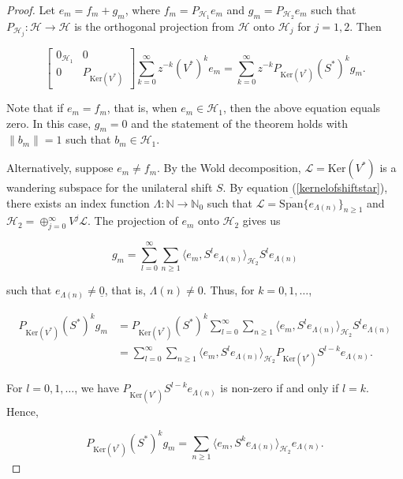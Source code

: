 \documentclass[10pt, reqno]{amsart}
\theoremstyle{definition}
\numberwithin{equation}{section}
\begin{document}
\begin{proof}
Let $e_{m}=f_{m}+g_{m}$, where $f_{m}=P_{\mathcal{H}_{1}}e_{m}$ and $g_{m}=P_{\mathcal{H}_{2}}e_{m}$ such that $P_{\mathcal{H}_{j}}:\mathcal{H}\rightarrow \mathcal{H}$ is the orthogonal projection from $\mathcal{H}$ onto $\mathcal{H}_{j}$ for $j=1,2$. Then

$$\begin{bmatrix}
0_{\mathcal{H}_{1}} & 0\\
0& P_{\mathrm{Ker}(V^{*})}
\end{bmatrix}\sum_{k=0}^{\infty}z^{-k}(V^{*})^{k}e_{m} = \sum_{k=0}^{\infty}z^{-k}
 P_{\mathrm{Ker}(V^{*})}(S^{*})^{k}g_{m}.$$

\noindent Note that if $e_{m}=f_{m}$, that is, when $e_{m}\in\mathcal{H}_{1}$, then the above equation equals zero. In this case, $g_{m}=0$ and the statement of the theorem holds with $\|b_{m}\|=1$ such that $b_{m}\in\mathcal{H}_{1}$. 

Alternatively, suppose $e_{m}\neq f_{m}$. By the Wold decomposition, $\mathcal{L}=\mathrm{Ker}(V^{*})$ is a wandering subspace for the unilateral shift $S$. By equation (\ref{kernelofshiftstar}), there exists an index function $\Lambda:\mathbb{N}\rightarrow \mathbb{N}_{0}$ such that $\mathcal{L}=\overline{\mathrm{Span}}\big\{e_{\Lambda(n)}\big\}_{n\geq 1}$ and $\mathcal{H}_{2}=\oplus_{j=0}^{\infty}V^{j}\mathcal{L}$. The projection of $e_{m}$ onto $\mathcal{H}_{2}$ gives us 

$$g_{m}=\sum_{l=0}^{\infty}\sum_{n\geq 1} \big\langle e_{m}, S^{l}e_{\Lambda(n)}\big\rangle_{\mathcal{H}_{2}}S^{l}e_{\Lambda(n)}$$

\noindent such that $e_{\Lambda(n)}\neq \underline{0}$, that is, $\Lambda(n)\neq 0$. Thus, for $k=0,1,\hdots$,

\begin{align*} P_{\mathrm{Ker}(V^{*})}(S^{*})^{k}g_{m}&=  P_{\mathrm{Ker}(V^{*})}(S^{*})^{k}\sum_{l=0}^{\infty}\sum_{n\geq 1} \big\langle e_{m}, S^{l}e_{\Lambda(n)}\big\rangle_{\mathcal{H}_{2}}S^{l}e_{\Lambda(n)}\\
&= \sum_{l=0}^{\infty}\sum_{n\geq 1} \big\langle e_{m}, S^{l}e_{\Lambda(n)}\big\rangle_{\mathcal{H}_{2}}P_{\mathrm{Ker}(V^{*})}S^{l-k}e_{\Lambda(n)}.
\end{align*}

\noindent For $l=0,1,\hdots$, we have $P_{\mathrm{Ker}(V^{*})}S^{l-k}e_{\Lambda(n)}$ is non-zero if and only if $l=k$. Hence,

$$P_{\mathrm{Ker}(V^{*})}(S^{*})^{k}g_{m}= \sum_{n\geq 1} \big\langle e_{m}, S^{k}e_{\Lambda(n)}\big\rangle_{\mathcal{H}_{2}}e_{\Lambda(n)}.$$


\end{proof}
\end{document}
